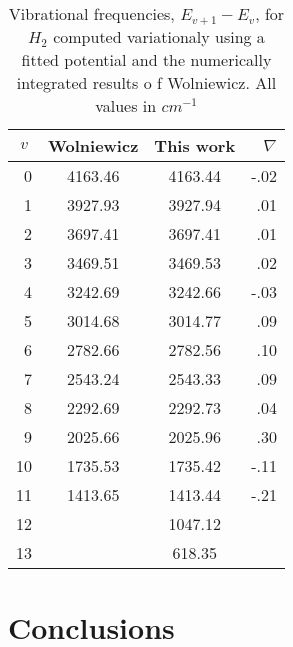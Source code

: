 \documentclass[12pt,thmsa]{article}
\begin{document}
\begin{table}[tbp] \centering%
\begin{tabular}{cccr}
\hline\hline
$v$ & Wolniewicz & This work & $\nabla $ \\ \hline
\multicolumn{1}{r}{0} & 4163.46 & 4163.44 & -.02 \\ 
\multicolumn{1}{r}{1} & 3927.93 & 3927.94 & .01 \\ 
\multicolumn{1}{r}{2} & 3697.41 & 3697.41 & \TEXTsymbol{<}.01 \\ 
\multicolumn{1}{r}{3} & 3469.51 & 3469.53 & .02 \\ 
\multicolumn{1}{r}{4} & 3242.69 & 3242.66 & -.03 \\ 
\multicolumn{1}{r}{5} & 3014.68 & 3014.77 & .09 \\ 
\multicolumn{1}{r}{6} & 2782.66 & 2782.56 & .10 \\ 
\multicolumn{1}{r}{7} & 2543.24 & 2543.33 & .09 \\ 
\multicolumn{1}{r}{8} & 2292.69 & 2292.73 & .04 \\ 
\multicolumn{1}{r}{9} & 2025.66 & 2025.96 & .30 \\ 
\multicolumn{1}{r}{10} & 1735.53 & 1735.42 & -.11 \\ 
\multicolumn{1}{r}{11} & 1413.65 & 1413.44 & -.21 \\ 
\multicolumn{1}{r}{12} &  & 1047.12 &  \\ 
\multicolumn{1}{r}{13} &  & 618.35 &  \\ \hline
\end{tabular}
\caption{Vibrational frequencies, $ E_{v+1}-E_{v }$,  for $ H_2 $ computed variationaly
 using a fitted potential  and the numerically integrated results o f Wolniewicz.
 All values in $ cm^{-1} $ } \label{freqtab}%
\end{table}%

\section{Conclusions}
\end{document}
